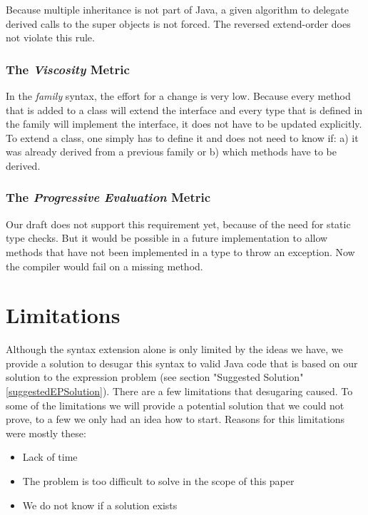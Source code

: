 \documentclass{report}
\begin{document}
Because multiple inheritance is not part of Java, a given algorithm to delegate derived calls to the super objects is not forced. The reversed extend-order does not violate this rule.

\subsubsection*{The \emph{Viscosity} Metric}

In the \emph{family} syntax, the effort for a change is very low. Because every method that is added to a class will extend the interface and every type that is defined in the family will implement the interface, it does not have to be updated explicitly. To extend a class, one simply has to define it and does not need to know if: a) it was already derived from a previous family or b) which methods have to be derived.

\subsubsection*{The \emph{Progressive Evaluation} Metric}

Our draft does not support this requirement yet, because of the need for static type checks. But it would be possible in a future implementation to allow methods that have not been implemented in a type to throw an exception. Now the compiler would fail on a missing method.














\label{syntaxExtensionEP}




\section{Limitations}
\label{syntaxExtensionLimitations}

Although the syntax extension alone is only limited by the ideas we have, we provide a solution to desugar this syntax to valid Java code that is based on our solution to the expression problem (see section "Suggested Solution" \ref{suggestedEPSolution}). There are a few limitations that desugaring caused. To some of the limitations we will provide a potential solution that we could not prove, to a few we only had an idea how to start. Reasons for this limitations were mostly these:
\begin{itemize}
  \item Lack of time
  \item The problem is too difficult to solve in the scope of this paper
  \item We do not know if a solution exists
\end{itemize}
\end{document}
